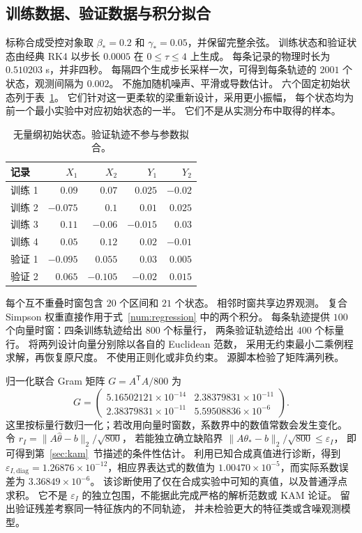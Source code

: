 \subsection{训练数据、验证数据与积分拟合}
\label{sx:training}
标称合成受控对象取 $\beta_*=0.2$ 和 $\gamma_*=0.05$，并保留完整余弦。
训练状态和验证状态由经典 RK4 以步长 $0.0005$ 在 $0\leq\tau\leq4$ 上生成。
每条记录的物理时长为 $0.510203$ s，并非四秒。
每隔四个生成步长采样一次，可得到每条轨迹的 $2001$ 个状态，观测间隔为 $0.002$。
不施加随机噪声、平滑或导数估计。
六个固定初始状态列于表~\ref{sx:initial-states}。
它们针对这一更柔软的梁重新设计，采用更小振幅，
每个状态均为前一个最小实验中对应初始状态的一半。
它们不是从实测分布中取得的样本。

\begin{table}[t]
\centering
\caption{无量纲初始状态。验证轨迹不参与参数拟合。}
\label{sx:initial-states}
\setlength{\tabcolsep}{3.3pt}
\begin{tabular}{lrrrr}
\toprule
记录 & $X_1$ & $X_2$ & $Y_1$ & $Y_2$\\
\midrule
训练 1 & $0.09$ & $0.07$ & $0.025$ & $-0.02$ \\
训练 2 & $-0.075$ & $0.1$ & $0.01$ & $0.025$ \\
训练 3 & $0.11$ & $-0.06$ & $-0.015$ & $0.03$ \\
训练 4 & $0.05$ & $0.12$ & $0.02$ & $-0.01$ \\
验证 1 & $-0.095$ & $0.055$ & $0.03$ & $0.005$ \\
验证 2 & $0.065$ & $-0.105$ & $-0.02$ & $0.015$ \\
\bottomrule
\end{tabular}
\end{table}

每个互不重叠时窗包含 $20$ 个区间和 $21$ 个状态。
相邻时窗共享边界观测。
复合 Simpson 权重直接作用于式~\eqref{num:regression} 中的两个积分。
每条轨迹提供 $100$ 个向量时窗：四条训练轨迹给出 $800$ 个标量行，
两条验证轨迹给出 $400$ 个标量行。
将两列设计向量分别除以各自的 Euclidean 范数，
采用无约束最小二乘例程求解，再恢复原尺度。
不使用正则化或非负约束。
源脚本检验了矩阵满列秩。

归一化联合 Gram 矩阵 $G=A^{\mathsf T}A/800$ 为
\begin{equation}
 G=\begin{pmatrix}5.16502121\times10^{-14} & 2.38379831\times10^{-11}\\2.38379831\times10^{-11} & 5.59508836\times10^{-6}\end{pmatrix}.
 \label{sx:gram}
\end{equation}
这里按标量行数归一化；若改用向量时窗数，系数界中的数值常数会发生变化。
令 $r_I=\|A\widehat\theta-b\|_2/\sqrt{800}$，
若能独立确立缺陷界 $\|A\theta_*-b\|_2/\sqrt{800}\leq\varepsilon_I$，
即可得到第~\ref{sec:kam}~节描述的条件性估计。
利用已知合成真值进行诊断，得到
$\varepsilon_{I,\mathrm{diag}}=1.26876\times10^{-12}$，相应界表达式的数值为
$1.00470\times10^{-5}$，而实际系数误差为 $3.36849\times10^{-6}$。
该诊断使用了仅在合成实验中可知的真值，以及普通浮点求积。
它不是 $\varepsilon_I$ 的独立包围，不能据此完成严格的解析范数或 KAM 论证。
留出验证残差考察同一特征族内的不同轨迹，
并未检验更大的特征类或含噪观测模型。

